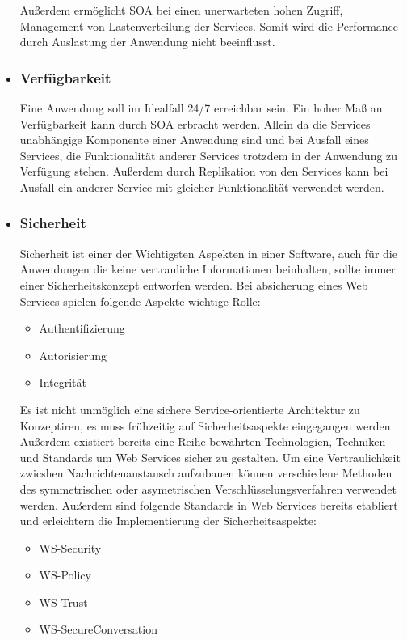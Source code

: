 \begin{itemize}
Außerdem ermöglicht SOA bei einen unerwarteten hohen Zugriff, Management von Lastenverteilung der Services. Somit wird die Performance durch Auslastung der Anwendung nicht beeinflusst.
\item \subsubsection*{Verfügbarkeit} Eine Anwendung soll im Idealfall 24/7 erreichbar sein. Ein hoher Maß an Verfügbarkeit kann durch SOA erbracht werden. Allein da die Services unabhängige Komponente einer Anwendung sind und bei Ausfall eines Services, die Funktionalität anderer Services trotzdem in der Anwendung zu Verfügung stehen. Außerdem durch Replikation von den Services kann bei Ausfall ein anderer Service mit gleicher Funktionalität verwendet werden.  
\item \subsubsection*{Sicherheit} Sicherheit ist einer der Wichtigsten Aspekten in einer Software, auch für die Anwendungen die keine vertrauliche Informationen beinhalten, sollte immer einer Sicherheitskonzept entworfen werden. Bei absicherung eines Web Services spielen folgende Aspekte wichtige Rolle:
\begin{itemize}
\item Authentifizierung
\item Autorisierung
\item Integrität
\end{itemize}
Es ist nicht unmöglich eine sichere Service-orientierte Architektur zu Konzeptiren, es muss frühzeitig auf Sicherheitsaspekte eingegangen werden. Außerdem existiert bereits eine Reihe bewährten Technologien, Techniken und Standards um Web Services sicher zu gestalten. 
Um eine Vertraulichkeit zwicshen Nachrichtenaustausch aufzubauen können verschiedene Methoden des symmetrischen oder asymetrischen Verschlüsselungsverfahren verwendet werden.
Außerdem sind folgende Standards in Web Services bereits etabliert und erleichtern die Implementierung der Sicherheitsaspekte:
\begin{itemize}
\item WS-Security
\item WS-Policy
\item WS-Trust
\item WS-SecureConversation

\end{itemize}
\end{itemize}
